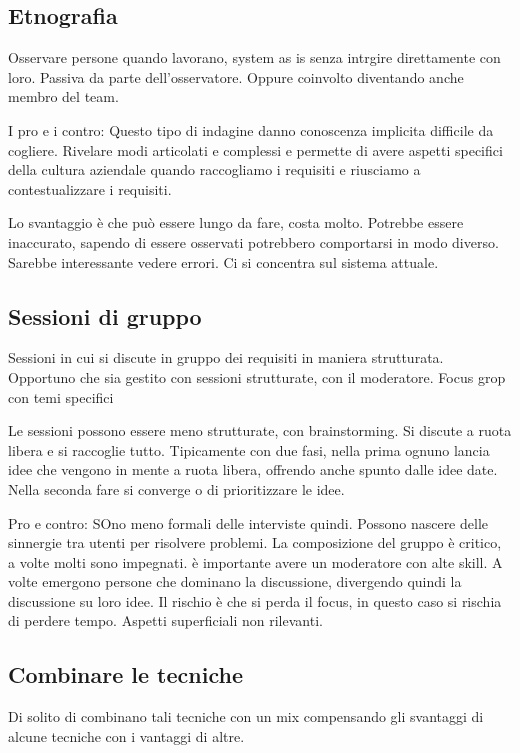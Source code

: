 \documentclass[oneside,a4paper,11pt]{book}
\theoremstyle{italicstyle}
\theoremstyle{normStyle}
\begin{document}
\subsection{Etnografia}
Osservare persone quando lavorano, system as is senza intrgire direttamente 
con loro. Passiva da parte dell'osservatore. Oppure coinvolto diventando anche 
membro del team.

I pro e i contro:
Questo tipo di indagine danno conoscenza implicita difficile da cogliere.
Rivelare modi articolati e complessi e permette di avere aspetti specifici della cultura aziendale 
quando raccogliamo i requisiti e riusciamo a contestualizzare i requisiti.

Lo svantaggio è che può essere lungo da fare, costa molto. Potrebbe essere 
inaccurato, sapendo di essere osservati potrebbero comportarsi in modo diverso.
Sarebbe interessante vedere errori. Ci si concentra sul sistema attuale.

\subsection{Sessioni di gruppo}
Sessioni in cui si discute in gruppo dei requisiti in maniera strutturata.
Opportuno che sia gestito con sessioni strutturate, con il moderatore.
Focus grop con temi specifici

Le sessioni possono essere meno strutturate, con brainstorming.
Si discute a ruota libera e si raccoglie tutto. Tipicamente con 
due fasi, nella prima ognuno lancia idee che vengono in mente 
a ruota libera, offrendo anche spunto dalle idee date.
Nella seconda fare si converge o di prioritizzare le idee.

Pro e contro:
SOno meno formali delle interviste quindi. Possono nascere delle sinnergie tra utenti 
per risolvere problemi. La composizione del gruppo è critico, a volte molti sono 
impegnati. è importante avere un moderatore con alte skill.
A volte emergono persone che dominano la discussione, divergendo quindi 
la discussione su loro idee. Il rischio è che si perda il focus, in questo caso si rischia
di perdere tempo. Aspetti superficiali non rilevanti.
\subsection{Combinare le tecniche}
Di solito di combinano tali tecniche con un mix compensando gli svantaggi 
di alcune tecniche con i vantaggi di altre.

\end{document}
